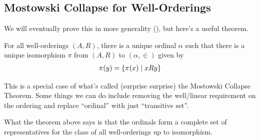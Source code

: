 \subsection{Mostowski Collapse for Well-Orderings}

We will eventually prove this in more generality (), but here's a useful theorem.

\begin{boxtheorem}\label{Ch1:Thm:Mostowski_WO}
    For all well-orderings $(A, R)$, there is a unique ordinal $\alpha$ such that there is a unique isomorphism $\pi$ from $(A, R)$ to $(\alpha, \in)$ given by
    \begin{align*}
        \pi(y) = \left\{ \pi(x) \; \middle\vert \; x R y \right\}
    \end{align*}
\end{boxtheorem}

This is a special case of what's called (surprise surprise) the Mostowski Collapse Theorem. Some things we can do include removing the well/linear requirement on the ordering and replace ``ordinal'' with just ``transitive set''.

What the theorem above says is that the ordinals form a complete set of representatives for the class of all well-orderings up to isomorphism.

